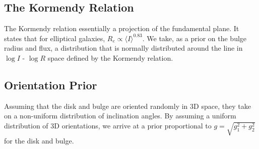 \documentclass{article}
\begin{document}
\subsection{The Kormendy Relation}
The Kormendy relation essentially a projection of the fundamental
plane.  It states that for elliptical galaxies, 
$R_e \propto \langle I \rangle^{0.83}$.  
We take, as a prior on the bulge radius and flux, a
distribution that is normally distributed around the line in $\log I$
- $\log R$ space defined by the Kormendy relation.

\subsection{Orientation Prior}
Assuming that the disk and bulge are oriented randomly in 3D space, 
they take on a non-uniform distribution of inclination angles.  By
assuming a uniform distribution of 3D orientations, we arrive at a
 prior proportional to $g = \sqrt{g_1^2 + g_2^2}$ for the disk and bulge.
\end{document}

